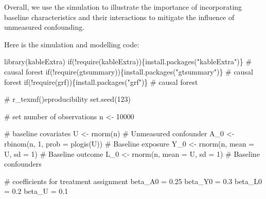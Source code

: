 \documentclass[
  singlecolumn]{article}
\newenvironment{Shaded}{}{}
\newcommand{\AttributeTok}[1]{\textcolor[rgb]{0.84,0.23,0.29}{#1}}
\newcommand{\CommentTok}[1]{\textcolor[rgb]{0.42,0.45,0.49}{#1}}
\newcommand{\ControlFlowTok}[1]{\textcolor[rgb]{0.84,0.23,0.29}{#1}}
\newcommand{\DecValTok}[1]{\textcolor[rgb]{0.00,0.36,0.77}{#1}}
\newcommand{\FloatTok}[1]{\textcolor[rgb]{0.00,0.36,0.77}{#1}}
\newcommand{\FunctionTok}[1]{\textcolor[rgb]{0.44,0.26,0.76}{#1}}
\newcommand{\NormalTok}[1]{\textcolor[rgb]{0.14,0.16,0.18}{#1}}
\newcommand{\OtherTok}[1]{\textcolor[rgb]{0.44,0.26,0.76}{#1}}
\newcommand{\SpecialCharTok}[1]{\textcolor[rgb]{0.00,0.36,0.77}{#1}}
\newcommand{\StringTok}[1]{\textcolor[rgb]{0.01,0.18,0.38}{#1}}
\begin{document}
Overall, we use the simulation to illustrate the importance of
incorporating baseline characteristics and their interactions to
mitigate the influence of unmeasured confounding.

Here is the simulation and modelling code:

\begin{Shaded}
\begin{Highlighting}[]
\FunctionTok{library}\NormalTok{(kableExtra)}
\ControlFlowTok{if}\NormalTok{(}\SpecialCharTok{!}\FunctionTok{require}\NormalTok{(kableExtra))\{}\FunctionTok{install.packages}\NormalTok{(}\StringTok{"kableExtra"}\NormalTok{)\} }\CommentTok{\# causal forest}
\ControlFlowTok{if}\NormalTok{(}\SpecialCharTok{!}\FunctionTok{require}\NormalTok{(gtsummary))\{}\FunctionTok{install.packages}\NormalTok{(}\StringTok{"gtsummary"}\NormalTok{)\} }\CommentTok{\# causal forest}
\ControlFlowTok{if}\NormalTok{(}\SpecialCharTok{!}\FunctionTok{require}\NormalTok{(grf))\{}\FunctionTok{install.packages}\NormalTok{(}\StringTok{"grf"}\NormalTok{)\} }\CommentTok{\# causal forest}

\CommentTok{\# r\_texmf()eproducibility}
\FunctionTok{set.seed}\NormalTok{(}\DecValTok{123}\NormalTok{) }

\CommentTok{\# set number of observations}
\NormalTok{n }\OtherTok{\textless{}{-}} \DecValTok{10000} 

\CommentTok{\# baseline covariates}
\NormalTok{U }\OtherTok{\textless{}{-}} \FunctionTok{rnorm}\NormalTok{(n) }\CommentTok{\# Unmeasured confounder}
\NormalTok{A\_0 }\OtherTok{\textless{}{-}} \FunctionTok{rbinom}\NormalTok{(n, }\DecValTok{1}\NormalTok{, }\AttributeTok{prob =} \FunctionTok{plogis}\NormalTok{(U)) }\CommentTok{\# Baseline exposure}
\NormalTok{Y\_0 }\OtherTok{\textless{}{-}} \FunctionTok{rnorm}\NormalTok{(n, }\AttributeTok{mean =}\NormalTok{ U, }\AttributeTok{sd =} \DecValTok{1}\NormalTok{) }\CommentTok{\# Baseline outcome}
\NormalTok{L\_0 }\OtherTok{\textless{}{-}} \FunctionTok{rnorm}\NormalTok{(n, }\AttributeTok{mean =}\NormalTok{ U, }\AttributeTok{sd =} \DecValTok{1}\NormalTok{) }\CommentTok{\# Baseline confounders}

\CommentTok{\# coefficients for treatment assignment}
\NormalTok{beta\_A0 }\OtherTok{=} \FloatTok{0.25}
\NormalTok{beta\_Y0 }\OtherTok{=} \FloatTok{0.3}
\NormalTok{beta\_L0 }\OtherTok{=} \FloatTok{0.2}
\NormalTok{beta\_U }\OtherTok{=} \FloatTok{0.1}


\end{Highlighting}
\end{Shaded}
\end{document}
